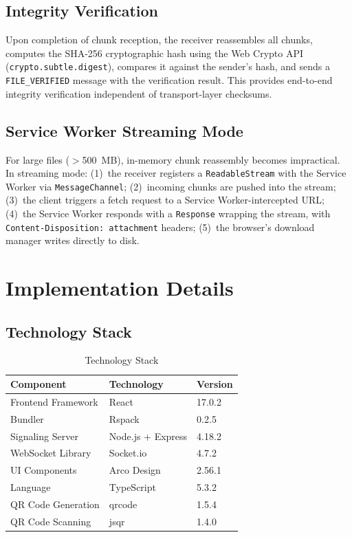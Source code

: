 \documentclass[conference]{IEEEtran}
\begin{document}
\subsection{Integrity Verification}
Upon completion of chunk reception, the receiver reassembles all chunks, computes the SHA-256 cryptographic hash using the Web Crypto API (\texttt{crypto.subtle.digest}), compares it against the sender's hash, and sends a \texttt{FILE\_VERIFIED} message with the verification result. This provides end-to-end integrity verification independent of transport-layer checksums.

\subsection{Service Worker Streaming Mode}
For large files ($>$500~MB), in-memory chunk reassembly becomes impractical. In streaming mode: (1)~the receiver registers a \texttt{ReadableStream} with the Service Worker via \texttt{MessageChannel}; (2)~incoming chunks are pushed into the stream; (3)~the client triggers a fetch request to a Service Worker-intercepted URL; (4)~the Service Worker responds with a \texttt{Response} wrapping the stream, with \texttt{Content-Disposition: attachment} headers; (5)~the browser's download manager writes directly to disk.

\section{Implementation Details}

\subsection{Technology Stack}

\begin{table}[htbp]
\caption{Technology Stack}
\label{tab:techstack}
\centering
\begin{tabular}{@{}lll@{}}
\toprule
\textbf{Component} & \textbf{Technology} & \textbf{Version} \\
\midrule
Frontend Framework & React & 17.0.2 \\
Bundler & Rspack & 0.2.5 \\
Signaling Server & Node.js + Express & 4.18.2 \\
WebSocket Library & Socket.io & 4.7.2 \\
UI Components & Arco Design & 2.56.1 \\
Language & TypeScript & 5.3.2 \\
QR Code Generation & qrcode & 1.5.4 \\
QR Code Scanning & jsqr & 1.4.0 \\
\bottomrule
\end{tabular}
\end{table}
\end{document}
